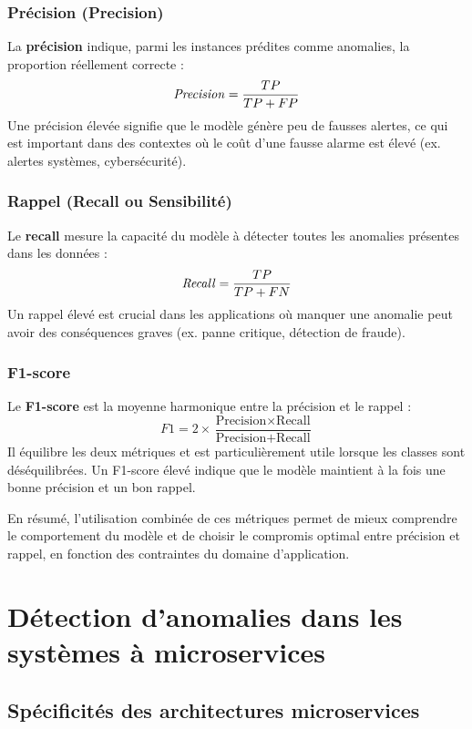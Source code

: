 \documentclass[a4paper,12pt]{report}
\begin{document}
\subsubsection{Précision (Precision)}

La \textbf{précision} indique, parmi les instances prédites comme anomalies, la proportion réellement correcte :
\[
\text{\textit{Precision}} = \frac{TP}{TP + FP}
\]
Une précision élevée signifie que le modèle génère peu de fausses alertes, ce qui est important dans des contextes où le coût d’une fausse alarme est élevé (ex. alertes systèmes, cybersécurité).

\subsubsection{Rappel (Recall ou Sensibilité)}

Le \textbf{recall} mesure la capacité du modèle à détecter toutes les anomalies présentes dans les données :
\[
\text{\textit{Recall}} = \frac{TP}{TP + FN}
\]
Un rappel élevé est crucial dans les applications où manquer une anomalie peut avoir des conséquences graves (ex. panne critique, détection de fraude).

\subsubsection{F1-score}

Le \textbf{F1-score} est la moyenne harmonique entre la précision et le rappel :
\[
\textit{F1} = 2 \times \frac{\text{Precision} \times \text{Recall}}{\text{Precision} + \text{Recall}}
\]
Il équilibre les deux métriques et est particulièrement utile lorsque les classes sont déséquilibrées.  
Un F1-score élevé indique que le modèle maintient à la fois une bonne précision et un bon rappel.

En résumé, l’utilisation combinée de ces métriques permet de mieux comprendre le comportement du modèle et de choisir le compromis optimal entre précision et rappel, en fonction des contraintes du domaine d’application.


\section{Détection d’anomalies dans les systèmes à microservices}

\subsection{Spécificités des architectures microservices}
\end{document}

